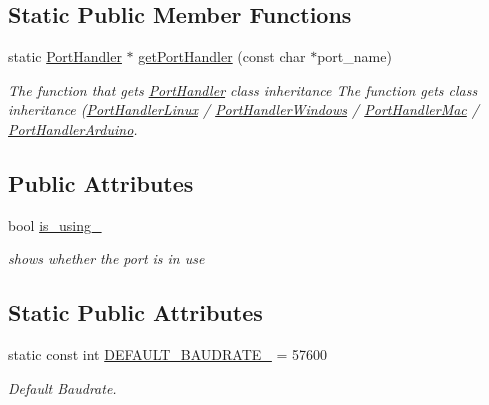 \subsection*{Static Public Member Functions}
\begin{DoxyCompactItemize}
\item 
static \hyperlink{classmercury_1_1_port_handler}{Port\+Handler} $\ast$ \hyperlink{classmercury_1_1_port_handler_a6804fc0bb0a9a9bfcaa1d615cac36890}{get\+Port\+Handler} (const char $\ast$port\+\_\+name)\hypertarget{classmercury_1_1_port_handler_a6804fc0bb0a9a9bfcaa1d615cac36890}{}\label{classmercury_1_1_port_handler_a6804fc0bb0a9a9bfcaa1d615cac36890}

\begin{DoxyCompactList}\small\item\em The function that gets \hyperlink{classmercury_1_1_port_handler}{Port\+Handler} class inheritance  The function gets class inheritance (\hyperlink{classmercury_1_1_port_handler_linux}{Port\+Handler\+Linux} / \hyperlink{classmercury_1_1_port_handler_windows}{Port\+Handler\+Windows} / \hyperlink{classmercury_1_1_port_handler_mac}{Port\+Handler\+Mac} / \hyperlink{classmercury_1_1_port_handler_arduino}{Port\+Handler\+Arduino}. \end{DoxyCompactList}\end{DoxyCompactItemize}
\subsection*{Public Attributes}
\begin{DoxyCompactItemize}
\item 
bool \hyperlink{classmercury_1_1_port_handler_acd0f51362140dd0773432d6cb48653ab}{is\+\_\+using\+\_\+}\hypertarget{classmercury_1_1_port_handler_acd0f51362140dd0773432d6cb48653ab}{}\label{classmercury_1_1_port_handler_acd0f51362140dd0773432d6cb48653ab}

\begin{DoxyCompactList}\small\item\em shows whether the port is in use \end{DoxyCompactList}\end{DoxyCompactItemize}
\subsection*{Static Public Attributes}
\begin{DoxyCompactItemize}
\item 
static const int \hyperlink{classmercury_1_1_port_handler_a241e299ebcc92dd959f1a7e689e80d6c}{D\+E\+F\+A\+U\+L\+T\+\_\+\+B\+A\+U\+D\+R\+A\+T\+E\+\_\+} = 57600\hypertarget{classmercury_1_1_port_handler_a241e299ebcc92dd959f1a7e689e80d6c}{}\label{classmercury_1_1_port_handler_a241e299ebcc92dd959f1a7e689e80d6c}

\begin{DoxyCompactList}\small\item\em Default Baudrate. \end{DoxyCompactList}\end{DoxyCompactItemize}


